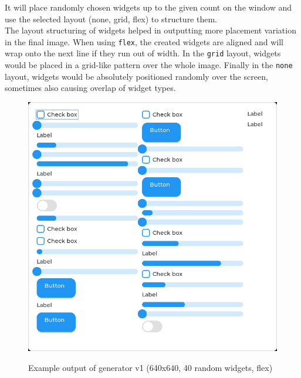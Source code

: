 \documentclass[Bachelor, BIC, english, fhCitStyle, IEEE]{BASE/twbook} %
\def\code#1{\texttt{#1}}
\begin{document}
It will place randomly chosen widgets up to the given count on the window and use the selected layout (none, grid, flex) to structure them.\\
The layout structuring of widgets helped in outputting more placement variation in the final image. When using \code{flex}, the created widgets are aligned and will wrap onto the next line if they run out of width. In the \code{grid} layout, widgets would be placed in a grid-like pattern over the whole image. Finally in the \code{none} layout, widgets would be absolutely positioned randomly over the screen, sometimes also causing overlap of widget types.
\begin{figure}
    \caption{Example output of generator v1 (640x640, 40 random widgets, flex)}
    \centering
    \includegraphics[width=\textwidth]{generator_v1_example.jpg}
    \label{fig:genv1example}
\end{figure}
\clearpage
\end{document}
